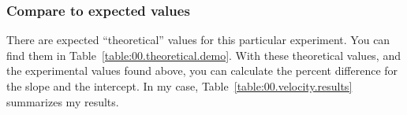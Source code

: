 \subsubsection{Compare to expected values}
%
There are expected ``theoretical'' values for this particular experiment. You can find them in Table~\ref{table:00.theoretical.demo}. With these theoretical values, and the experimental values found above, you can calculate the percent difference for the slope and the intercept. In my case, Table~\ref{table:00.velocity.results} summarizes my results.
%
\begin{center}
\end{center}
%
